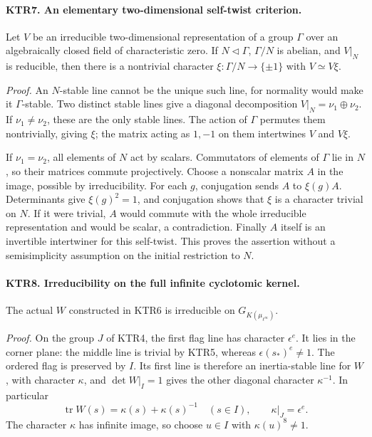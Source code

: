 \documentclass[11pt,a4paper]{article}
\numberwithin{equation}{section}
\theoremstyle{remark}\newtheorem{remark}[theorem]{Remark}
\begin{document}
\paragraph{KTR7. An elementary two-dimensional self-twist criterion.}
\label{claim:KTR7}
Let \(V\) be an irreducible two-dimensional representation of
a group \(\Gamma\) over an algebraically closed field of
characteristic zero.  If \(N\lhd\Gamma\), \(\Gamma/N\)
is abelian, and \(V|_N\) is reducible, then there is a
nontrivial character \(\xi:\Gamma/N\to\{\pm1\}\) with
\(V\simeq V\xi\).

\emph{Proof.}
An \(N\)-stable line cannot be the unique such line, for
normality would make it \(\Gamma\)-stable.  Two distinct
stable lines give a diagonal decomposition
\(V|_N=\nu_1\oplus\nu_2\).
If \(\nu_1\ne\nu_2\), these are the only stable lines.
The action of \(\Gamma\) permutes them nontrivially, giving
\(\xi\); the matrix acting as \(1,-1\) on them intertwines
\(V\) and \(V\xi\).

If \(\nu_1=\nu_2\), all elements of \(N\) act by scalars.
Commutators of elements of \(\Gamma\) lie in \(N\), so
their matrices commute projectively.  Choose a nonscalar matrix
\(A\) in the image, possible by irreducibility.  For each
\(g\), conjugation sends \(A\) to \(\xi(g)A\).
Determinants give \(\xi(g)^2=1\), and conjugation shows that
\(\xi\) is a character trivial on \(N\).
If it were trivial, \(A\) would commute with the whole
irreducible representation and would be scalar, a contradiction.
Finally \(A\) itself is an invertible intertwiner for this
self-twist.  This proves the assertion without a semisimplicity
assumption on the initial restriction to \(N\).

\paragraph{KTR8. Irreducibility on the full infinite cyclotomic kernel.}
\label{claim:KTR8}
The actual \(W\) constructed in KTR6 is irreducible on
\(G_{K(\mu_{\ell^\infty})}\).

\emph{Proof.}
On the group \(J\) of KTR4, the first flag line has character
\(\epsilon^e\).  It lies in the corner plane: the middle
line is trivial by KTR5, whereas \(\epsilon(s_*)^e\ne1\).
The ordered flag is preserved by \(I\).  Its first line is
therefore an inertia-stable line for \(W\), with character
\(\kappa\), and \(\det W|_I=1\) gives the other diagonal
character \(\kappa^{-1}\).  In particular
\[
 \operatorname{tr}W(s)=\kappa(s)+\kappa(s)^{-1}\quad(s\in I),
 \qquad \kappa|_J=\epsilon^e.
 \tag{KTR.13}
\]
The character \(\kappa\) has infinite image, so choose
\(u\in I\) with \(\kappa(u)^8\ne1\).
\end{document}
